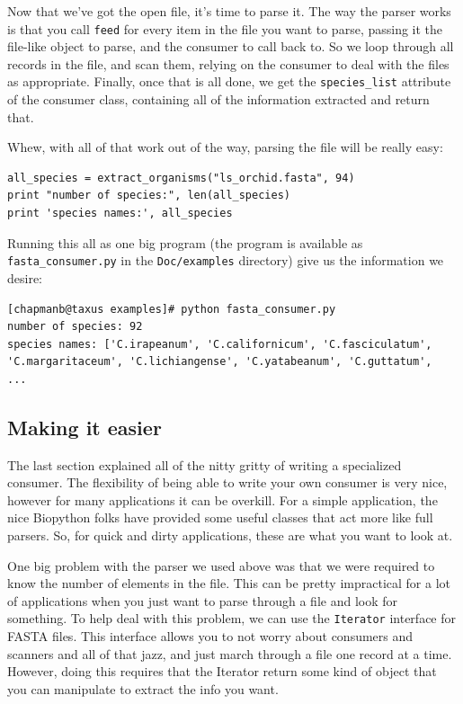 \documentclass{report}
\begin{document}
Now that we've got the open file, it's time to parse it. The way the parser works is that you call \verb|feed| for every item in the file you want to parse, passing it the file-like object to parse, and the consumer to call back to. So we loop through all records in the file, and scan them, relying on the consumer to deal with the files as appropriate. Finally, once that is all done, we get the \verb|species_list| attribute of the consumer class, containing all of the information extracted and return that.


Whew, with all of that work out of the way, parsing the file will be really easy:

\begin{verbatim}
all_species = extract_organisms("ls_orchid.fasta", 94)
print "number of species:", len(all_species)
print 'species names:', all_species
\end{verbatim}

Running this all as one big program (the program is available as \verb|fasta_consumer.py| in the \verb|Doc/examples| directory) give us the information we desire:

\begin{verbatim}
[chapmanb@taxus examples]# python fasta_consumer.py
number of species: 92
species names: ['C.irapeanum', 'C.californicum', 'C.fasciculatum', 
'C.margaritaceum', 'C.lichiangense', 'C.yatabeanum', 'C.guttatum',
...
\end{verbatim}

\subsection{Making it easier}
\label{sec:fasta-parsing}

The last section explained all of the nitty gritty of writing a specialized consumer. The flexibility of being able to write your own consumer is very nice, however for many applications it can be overkill. For a simple application, the nice Biopython folks have provided some useful classes that act more like full parsers. So, for quick and dirty applications, these are what you want to look at. 


One big problem with the parser we used above was that we were required to know the number of elements in the file. This can be pretty impractical for a lot of applications when you just want to parse through a file and look for something. To help deal with this problem, we can use the \verb|Iterator| interface for FASTA files. This interface allows you to not worry about consumers and scanners and all of that jazz, and just march through a file one record at a time. However, doing this requires that the Iterator return some kind of object that you can manipulate to extract the info you want.
\end{document}
